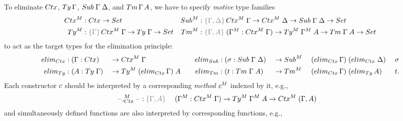 \documentclass[a4paper,UKenglish,numberwithinsect,cleveref,thm-restate]{lipics-v2021}
\begin{document}
To eliminate $\Ctx$, $\Ty\,\Gamma$, $\Sub\;\Gamma\;\Delta$, and $\Tm\,\Gamma\,A$, we have to specify \emph{motive} type families
\begin{align*}
  \Ctx^M & : \Ctx \to \Set &
  \Sub^M & : \implicit{\Gamma, \Delta}\,\Ctx^M\;\Gamma \to \Ctx^M\;\Delta \to \Sub\;\Gamma\;\Delta \to \Set \\
  \Ty^M  & : \implicit{\Gamma}\,\Ctx^M\;\Gamma \to \Ty\;\Gamma \to \Set & 
  \Tm^M  & : \implicit{\Gamma, A}\; (\Gamma^M : \Ctx^M\;\Gamma) \to \Ty^M\;\Gamma^M\;A \to \Tm\;\Gamma\;A \to \Set
\end{align*}
to act as the target types for the elimination principle:
\begin{alignat*}{10}
  \elim_{\Ctx} & : (\Gamma : \Ctx)   && \to \Ctx^M\;\Gamma &
  \elim_{\Sub} & : (\sigma : \Sub\;\Gamma\;\Delta) && \to \Sub^M\; && (\elim_{\Ctx}\,\Gamma)\;(\elim_{\Ctx}\;\Delta)\;&&\sigma \\
  \elim_{\Ty}  & : (A : \Ty\;\Gamma) && \to \Ty^M\;(\elim_{\Ctx}\,\Gamma)\;A \quad
               & \elim_{\Tm}  & : (t : \Tm\;\Gamma\;A) && \to \Tm^M\; && (\elim_{\Ctx}\,\Gamma)\;(\elim_{\Ty}\,A)\;&&t.
\end{alignat*}
Each constructor $\cc$ should be interpreted by a corresponding \emph{method} $\cc^M$ indexed by it, e.g.,
\begin{alignat*}{3}
  \blank,_{\Ctx}^M\blank & : \implicit{\Gamma, A}\; && (\Gamma^M : \Ctx^M\;\Gamma) \to \Ty^M\;\Gamma^M\;A \to \Ctx^M\;(\Gamma, A) %
\end{alignat*}
and simultaneously defined functions are also interpreted by corresponding functions, e.g.,
\end{document}
